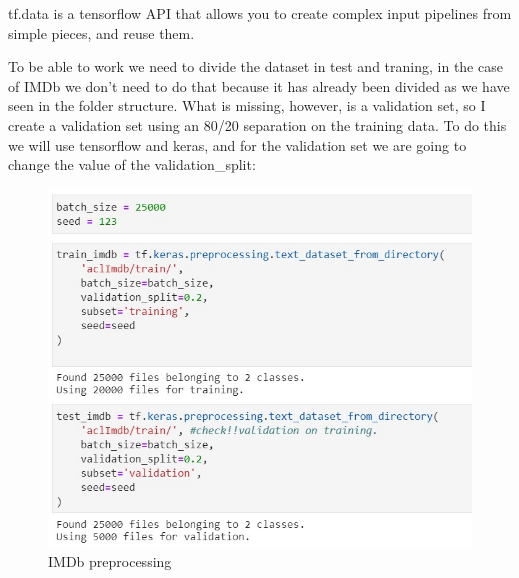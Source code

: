 tf.data is a tensorflow API that allows you to create complex input pipelines from simple pieces, and reuse them.

To be able to work we need to divide the dataset in test and traning, in the case of IMDb we don't need to do that because it has already been divided as we have seen in the folder structure. What is missing, however, is a validation set, so I create a validation set using an 80/20 separation on the training data. To do this we will use tensorflow and keras, and for the validation set we are going to change the value of the validation\_split:

\begin{figure}[ht!]
\centering
\includegraphics[width=1\textwidth]{images/preproimdb.jpg}
\caption{IMDb preprocessing}
\label{fig:fig_068}
\end{figure}
\FloatBarrier